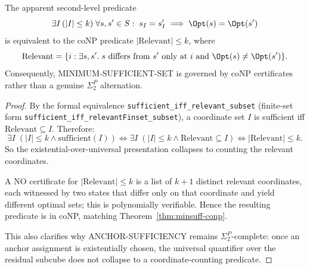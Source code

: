 \begin{theorem}
\label{thm:minsuff-collapse}
The apparent second-level predicate
\[
\exists I \, (|I| \leq k) \; \forall s,s' \in S:\; s_I = s'_I \implies \Opt(s)=\Opt(s')
\]
is equivalent to the coNP predicate $|\text{Relevant}| \le k$, where
\[
\text{Relevant} = \{i : \exists s,s'.\; s \text{ differs from } s' \text{ only at } i \text{ and } \Opt(s)\neq\Opt(s')\}.
\]
Consequently, MINIMUM-SUFFICIENT-SET is governed by coNP certificates rather than a genuine $\Sigma_2^P$ alternation.
\end{theorem}

\begin{proof}
By the formal equivalence \texttt{sufficient\_iff\_relevant\_subset} (finite-set form \texttt{sufficient\_iff\_relevantFinset\_subset}), a coordinate set $I$ is sufficient iff $\text{Relevant}\subseteq I$. Therefore:
\[
\exists I \; (|I|\le k \wedge \text{sufficient}(I))
\iff
\exists I \; (|I|\le k \wedge \text{Relevant}\subseteq I)
\iff
|\text{Relevant}| \le k.
\]
So the existential-over-universal presentation collapses to counting the relevant coordinates.

A NO certificate for $|\text{Relevant}| \le k$ is a list of $k+1$ distinct relevant coordinates, each witnessed by two states that differ only on that coordinate and yield different optimal sets; this is polynomially verifiable. Hence the resulting predicate is in coNP, matching Theorem~\ref{thm:minsuff-conp}.

This also clarifies why ANCHOR-SUFFICIENCY remains $\Sigma_2^P$-complete: once an anchor assignment is existentially chosen, the universal quantifier over the residual subcube does not collapse to a coordinate-counting predicate.
\end{proof}
